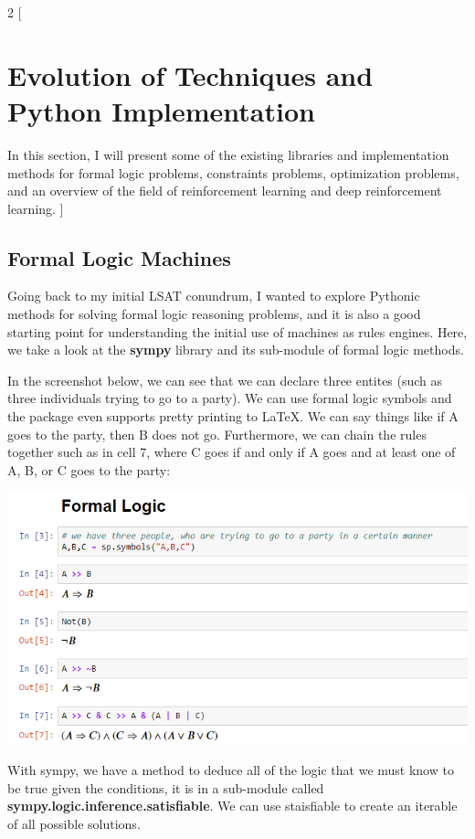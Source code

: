 \documentclass[a4paper,10pt]{extarticle}
\begin{document}
            \begin{multicols}{2}
            [
            \section{Evolution of Techniques and Python Implementation}
            In this section, I will present some of the existing libraries and implementation methods for formal logic problems, constraints problems, optimization problems, and an overview of the field of reinforcement learning and deep reinforcement learning. 
            ]

            \subsection{Formal Logic Machines}
            Going back to my initial LSAT conundrum, I wanted to explore Pythonic methods for solving formal logic reasoning problems, and it is also a good starting point for understanding the initial use of machines as rules engines. Here, we take a look at the \textbf{sympy} library and its sub-module of formal logic methods. 

            In the screenshot below, we can see that we can declare three entites (such as three individuals trying to go to a party). We can use formal logic symbols and the package even supports pretty printing to LaTeX. We can say things like if A goes to the party, then B does not go. Furthermore, we can chain the rules together such as in cell 7, where C goes if and only if A goes and at least one of A, B, or C goes to the party: 

            \smallskip
            \includegraphics[scale=0.4]{screen1.png}

            \smallskip

            With sympy, we have a method to deduce all of the logic that we must know to be true given the conditions, it is in a sub-module called \textbf{sympy.logic.inference.satisfiable}.
            We can use staisfiable to create an iterable of all possible solutions. 


\end{multicols}
\end{document}
